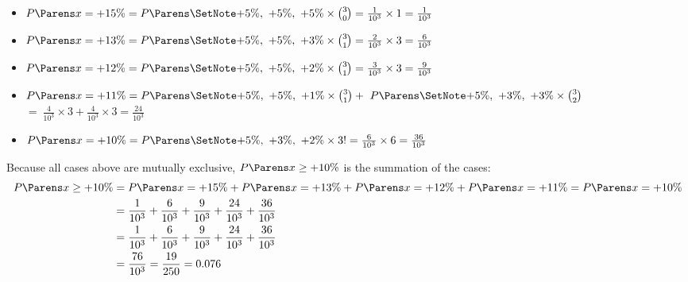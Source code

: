 \documentclass{ProblemSetCUNY}
\newcommand{\Prob}[1]{\ensuremath{P\Parens{#1}}\xspace}
\begin{document}
\begin{itemize}
\item  $\Prob{x = +15\%} = \Prob{\SetNote{+5\%,~+5\%,~+5\%}} \times \binom{3}{0} = \frac{1}{10^3} \times 1 = \frac{1}{10^3}$
\item  $\Prob{x = +13\%} = \Prob{\SetNote{+5\%,~+5\%,~+3\%}} \times \binom{3}{1} = \frac{2}{10^3} \times 3 = \frac{6}{10^3}$
\item  $\Prob{x = +12\%} = \Prob{\SetNote{+5\%,~+5\%,~+2\%}} \times \binom{3}{1} = \frac{3}{10^3} \times 3 = \frac{9}{10^3}$
\item  $\Prob{x = +11\%} = \Prob{\SetNote{+5\%,~+5\%,~+1\%}} \times \binom{3}{1} +~\Prob{\SetNote{+5\%,~+3\%,~+3\%}} \times \binom{3}{2}$\\
\hspace*{23.5mm}$ =~\frac{4}{10^3} \times 3 + \frac{4}{10^3} \times 3 = \frac{24}{10^3}$
\item  $\Prob{x = +10\%} = \Prob{\SetNote{+5\%,~+3\%,~+2\%}} \times 3! = \frac{6}{10^3} \times 6 = \frac{36}{10^3}$\\
\end{itemize}


Because all cases above are mutually exclusive, $\Prob{x \ge +10\%}$ is the summation of the cases:
\begin{align*}
\Prob{x \ge +10\%} &= \Prob{x = +15\%} + \Prob{x = +13\%} + \Prob{x = +12\%} + \Prob{x = +11\%} = \Prob{x = +10\%}\\ 
&= \frac{1}{10^3} + \frac{6}{10^3} + \frac{9}{10^3} + \frac{24}{10^3} + \frac{36}{10^3}\\
&= \frac{1}{10^3} + \frac{6}{10^3} + \frac{9}{10^3} + \frac{24}{10^3} + \frac{36}{10^3}\\
&= \frac{76}{10^3} = \frac{19}{250} = 0.076
\end{align*}
\end{document}
